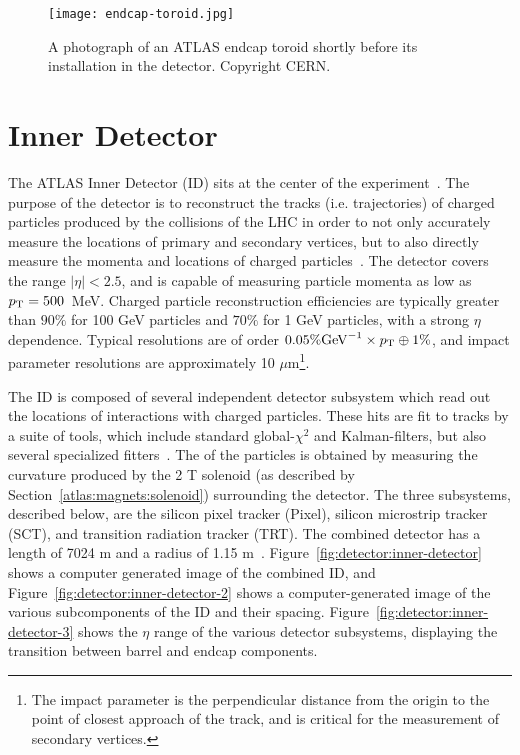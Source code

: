
\begin{figure}
\centering
\texttt{[image: endcap-toroid.jpg]}
\label{fig:detector:endcap-toroid}
\caption{A photograph of an ATLAS endcap toroid shortly before its installation in the detector. Copyright CERN.}
\end{figure}



\section{Inner Detector}

The ATLAS Inner Detector (ID) sits at the center of the experiment~\cite{ATLASPaper}. The purpose of the detector is to reconstruct the tracks (i.e. trajectories) of charged particles produced by the collisions of the LHC in order to not only accurately measure the locations of primary and secondary vertices, but to also directly measure the momenta and locations of charged particles~\cite{ATLASExpected}. The detector covers the range $|\eta| < 2.5$, and is capable of measuring particle momenta as low as $p_{\text{T}} = 500$~MeV. Charged particle reconstruction efficiencies are typically greater than $90\%$ for 100 GeV particles and $70\%$ for 1 GeV particles, with a strong $\eta$ dependence. Typical \pT resolutions are of order $0.05\% \mathrm{GeV}^{-1} \times p_{\text{T}} \oplus 1\%$, and impact parameter resolutions are approximately 10 $\mu$m\footnote{The impact parameter is the perpendicular distance from the origin to the point of closest approach of the track, and is critical for the measurement of secondary vertices.}. 

The ID is composed of several independent detector subsystem which read out the locations of interactions with charged particles. These hits are fit to tracks by a suite of tools, which include standard global-$\chi^2$ and Kalman-filters, but also several specialized fitters~\cite{ATLASExpected}. The \pT of the particles is obtained by measuring the curvature produced by the 2 T solenoid (as described by Section~\ref{atlas:magnets:solenoid}) surrounding the detector. The three subsystems, described below, are the silicon pixel tracker (Pixel), silicon microstrip tracker (SCT), and transition radiation tracker (TRT). The combined detector has a length of 7024 m and a radius of 1.15 m~\cite{ATLASPaper}. Figure~\ref{fig:detector:inner-detector} shows a computer generated image of the combined ID, and Figure~\ref{fig:detector:inner-detector-2} shows a computer-generated image of the various subcomponents of the ID and their spacing. Figure~\ref{fig:detector:inner-detector-3} shows the $\eta$ range of the various detector subsystems, displaying the transition between barrel and endcap components.

